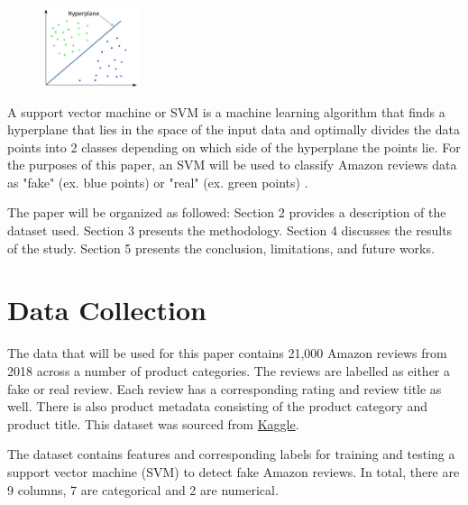 \documentclass[12pt]{article}
\begin{document}
\begin{figure}
    \centering
    \includegraphics[width=0.25\textwidth]{manuscript/svm.jpg}
\end{figure}
A support vector machine or SVM is a machine learning algorithm that finds a
hyperplane that lies in the space of the input data and optimally divides the data points into 2 classes depending on which side of the hyperplane the points lie. For the purposes of this paper, an SVM will be used to classify Amazon reviews data as "fake" (ex. blue points) or "real" (ex. green points) \citep{Evgeniou2001}.

The paper will be organized as followed: Section 2 provides a description of the dataset used. Section 3 presents the methodology. Section 4 discusses the results of the study. Section 5 presents the conclusion, limitations, and future works.

\section{Data Collection}
\label{sec:data}

The data that will be used for this paper contains 21,000 Amazon reviews from 2018 across a number of product categories. The reviews are labelled as either a fake or real review. Each review has a corresponding rating and review title as well. There is also product metadata consisting of the product category and product title. This dataset was sourced from \href{https://www.kaggle.com/datasets/lievgarcia/amazon-reviews}{Kaggle}. 

The dataset contains features and corresponding labels for training and testing a support vector machine (SVM) to detect fake Amazon reviews. In total, there are 9 columns, 7 are categorical and 2 are numerical. 

\bigskip
\bigskip
\end{document}
